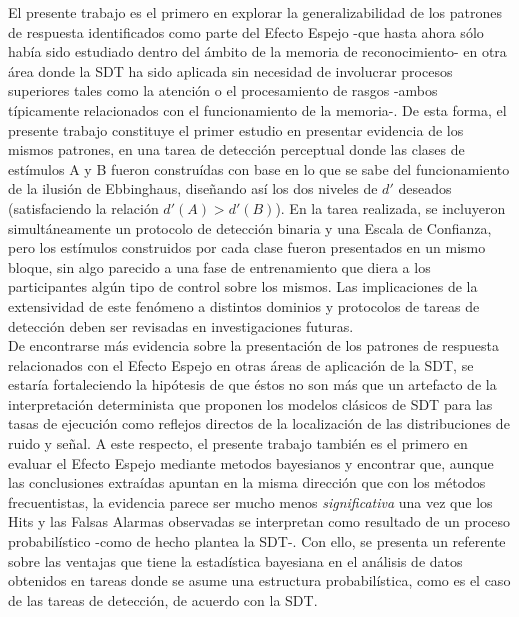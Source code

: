 El presente trabajo es el primero en explorar la generalizabilidad de los patrones de respuesta identificados como parte del Efecto Espejo -que hasta ahora sólo había sido estudiado dentro del ámbito de la memoria de reconocimiento- en otra área donde la SDT ha sido aplicada sin necesidad de involucrar procesos superiores tales como la atención o el procesamiento de rasgos -ambos típicamente relacionados con el funcionamiento de la memoria-. De esta forma, el presente trabajo constituye el primer estudio en presentar evidencia de los mismos patrones, en una tarea de detección perceptual donde las clases de estímulos A y B fueron construídas con base en lo que se sabe del funcionamiento de la ilusión de Ebbinghaus, diseñando así los dos niveles de $d'$ deseados (satisfaciendo la relación $d'(A)>d'(B)$). En la tarea realizada, se incluyeron simultáneamente un protocolo de detección binaria y una Escala de Confianza, pero los estímulos construidos por cada clase fueron presentados en un mismo bloque, sin algo parecido a una fase de entrenamiento que diera a los participantes algún tipo de control sobre los mismos. Las implicaciones de la extensividad de este fenómeno a distintos dominios y protocolos de tareas de detección deben ser revisadas en investigaciones futuras.\\

De encontrarse más evidencia sobre la presentación de los patrones de respuesta relacionados con el Efecto Espejo en otras áreas de aplicación de la SDT, se estaría fortaleciendo la hipótesis de que éstos no son más que un artefacto de la interpretación determinista que proponen los modelos clásicos de SDT para las tasas de ejecución como reflejos directos de la localización de las distribuciones de ruido y señal. A este respecto, el presente trabajo también es el primero en evaluar el Efecto Espejo mediante metodos bayesianos y encontrar que, aunque las conclusiones extraídas apuntan en la misma dirección que con los métodos frecuentistas, la evidencia parece ser mucho menos \textit{significativa} una vez que los Hits y las Falsas Alarmas observadas se interpretan como resultado de un proceso probabilístico -como de hecho plantea la SDT-. Con ello, se presenta un referente sobre las ventajas que tiene la estadística bayesiana en el análisis de datos obtenidos en tareas donde se asume una estructura probabilística, como es el caso de las tareas de detección, de acuerdo con la SDT. \\









